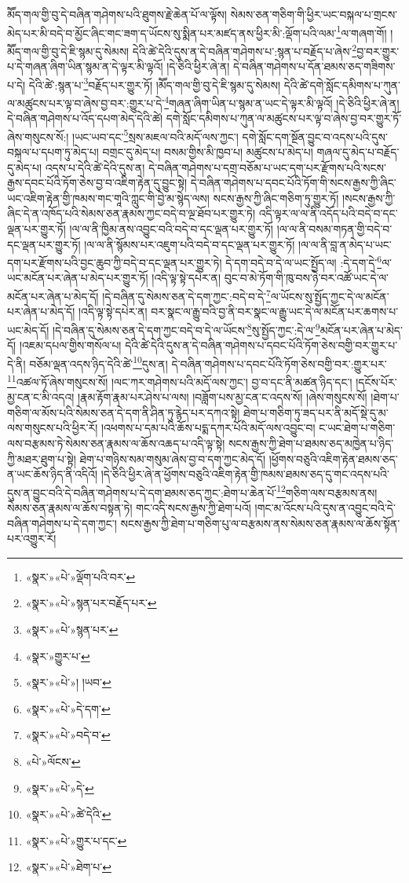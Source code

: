 མཽད་གལ་གྱི་བུ་དེ་བཞིན་གཤེགས་པའི་ཐུགས་རྗེ་ཆེན་པོ་ལ་ལྟོས། སེམས་ཅན་གཅིག་གི་ཕྱིར་ཡང་བསྐལ་པ་གྲངས་མེད་པར་མི་བདེ་བ་མྱོང་ཞིང་གང་ཟག་ད་ཡོངས་སུ་སྨིན་པར་མཛད་ནས་ཕྱིར་མི་:ལྡོག་པའི་ལམ་\footnote{«སྣར་»«པེ་»ལྡོག་པའི་བར་}ལ་གཞག་གོ། །མཽད་གལ་གྱི་བུ་དེ་ཇི་སྙམ་དུ་སེམས། དེའི་ཚེ་དེའི་དུས་ན་དེ་བཞིན་གཤེགས་པ་:སྙན་པ་བརྗོད་པ་ཞེས་\footnote{«སྣར་»«པེ་»སྙན་པར་བརྗོད་པར་}བྱ་བར་གྱུར་པ་དེ་གཞན་ཞིག་ཡིན་སྙམ་ན་དེ་ལྟར་མི་ལྟའོ། །དེ་ཅིའི་ཕྱིར་ཞེ་ན། དེ་བཞིན་གཤེགས་པ་དོན་ཐམས་ཅད་གཟིགས་པ་དེ། དེའི་ཚེ་:སྙན་པ་\footnote{«སྣར་»«པེ་»སྙན་པར་}བརྗོད་པར་གྱུར་ཏོ། །མཽད་གལ་གྱི་བུ་དེ་ཇི་སྙམ་དུ་སེམས། དེའི་ཚེ་དགེ་སློང་དམིགས་པ་ཀུན་ལ་མཚུངས་པར་ལྟ་བ་ཞེས་བྱ་བར་:གྱུར་པ་དེ་\footnote{«སྣར་»གྱུར་པ་}གཞན་ཞིག་ཡིན་པ་སྙམ་ན་ཡང་དེ་ལྟར་མི་ལྟའོ། །དེ་ཅིའི་ཕྱིར་ཞེ་ན། དེ་བཞིན་གཤེགས་པ་འོད་དཔག་མེད་དེའི་ཚེ། དགེ་སློང་དམིགས་པ་ཀུན་ལ་མཚུངས་པར་ལྟ་བ་ཞེས་བྱ་བར་གྱུར་ཏོ་ཞེས་གསུངས་སོ:། །ཡང་ཡབ་དང་\footnote{«སྣར་»«པེ་»། །ཡབ་}སྲས་མཇལ་བའི་མདོ་ལས་ཀྱང་། དགེ་སློང་དག་སྔོན་བྱུང་བ་འདས་པའི་དུས་བསྐལ་པ་དཔག་ཏུ་མེད་པ། བགྲང་དུ་མེད་པ། བསམ་གྱིས་མི་ཁྱབ་པ། མཚུངས་པ་མེད་པ། གཞལ་དུ་མེད་པ་བརྗོད་དུ་མེད་པ། འདས་པ་དེའི་ཚེ་དེའི་དུས་ན། དེ་བཞིན་གཤེགས་པ་དགྲ་བཅོམ་པ་ཡང་དག་པར་རྫོགས་པའི་སངས་རྒྱས་དབང་པོའི་ཏོག་ཅེས་བྱ་བ་འཇིག་རྟེན་དུ་བྱུང་སྟེ། དེ་བཞིན་གཤེགས་པ་དབང་པོའི་ཏོག་གི་སངས་རྒྱས་ཀྱི་ཞིང་ཡང་འཇིག་རྟེན་གྱི་ཁམས་གང་གཱའི་ཀླུང་གི་བྱེ་མ་སྙེད་ལས། སངས་རྒྱས་ཀྱི་ཞིང་གཅིག་ཏུ་གྱུར་ཏོ། །སངས་རྒྱས་ཀྱི་ཞིང་དེ་ན་འཁོད་པའི་སེམས་ཅན་རྣམས་ཀྱང་བདེ་བ་ལྔ་ཐོབ་པར་གྱུར་ཏེ། འདི་ལྟར་ལ་ལ་ནི་འདོད་པའི་བདེ་བ་དང་ལྡན་པར་གྱུར་ཏོ། །ལ་ལ་ནི་ཁྱིམ་ནས་འབྱུང་བའི་བདེ་བ་དང་ལྡན་པར་གྱུར་ཏོ། །ལ་ལ་ནི་བསམ་གཏན་གྱི་བདེ་བ་དང་ལྡན་པར་གྱུར་ཏོ། །ལ་ལ་ནི་སྙོམས་པར་འཇུག་པའི་བདེ་བ་དང་ལྡན་པར་གྱུར་ཏོ། །ལ་ལ་ནི་བླ་ན་མེད་པ་ཡང་དག་པར་རྫོགས་པའི་བྱང་ཆུབ་ཀྱི་བདེ་བ་དང་ལྡན་པར་གྱུར་ཏེ། དེ་དག་བདེ་བ་དེ་ལ་ཡང་སྤྱོད་ལ། :དེ་དག་དེ་\footnote{«སྣར་»«པེ་»དེ་དག་}ལ་ཡང་མངོན་པར་ཞེན་པ་མེད་པར་གྱུར་ཏོ། །འདི་ལྟ་སྟེ་དཔེར་ན། བུང་བ་མེ་ཏོག་གི་ཁུ་བས་ཉེ་བར་འཚོ་ཡང་དེ་ལ་མངོན་པར་ཞེན་པ་མེད་དོ། །དེ་བཞིན་དུ་སེམས་ཅན་དེ་དག་ཀྱང་:བདེ་བ་དེ་\footnote{«སྣར་»«པེ་»བདེ་བ་}ལ་ཡོངས་སུ་སྤྱོད་ཀྱང་དེ་ལ་མངོན་པར་ཞེན་པ་མེད་དོ། །འདི་ལྟ་སྟེ་དཔེར་ན། བར་སྣང་ལ་རྒྱུ་བའི་བྱ་ནི་བར་སྣང་ལ་རྒྱུ་ཡང་དེ་ལ་མངོན་པར་ཆགས་པ་ཡང་མེད་དོ། །དེ་བཞིན་དུ་སེམས་ཅན་དེ་དག་ཀྱང་བདེ་བ་དེ་ལ་ཡོངས་\footnote{«པེ་»ལོངས་}སུ་སྤྱོད་ཀྱང་:དེ་ལ་\footnote{«སྣར་»«པེ་»དེ་}མངོན་པར་ཞེན་པ་མེད་དོ། །འཇམ་དཔལ་གྱིས་གསོལ་པ། དེའི་ཚེ་དེའི་དུས་ན་དེ་བཞིན་གཤེགས་པ་དབང་པོའི་ཏོག་ཅེས་བགྱི་བར་གྱུར་པ་དེ་ནི། བཅོམ་ལྡན་འདས་ཉིད་དེའི་ཚེ་\footnote{«སྣར་»«པེ་»ཚེ་དེའི་}དུས་ན། དེ་བཞིན་གཤེགས་པ་དབང་པོའི་ཏོག་ཅེས་བགྱི་བར་:གྱུར་པར་\footnote{«སྣར་»«པེ་»གྱུར་པ་དང་}འཚལ་ཏོ་ཞེས་གསུངས་སོ། །ལང་ཀར་གཤེགས་པའི་མདོ་ལས་ཀྱང་། བྱ་བ་དང་ནི་མཚན་ཉིད་དང་། །དངོས་པོར་མྱ་ངན་ང་མི་འདའ། །རྣམ་རྟོག་རྣམ་པར་ཤེས་པ་ལས། །བཟློག་པས་མྱ་ངན་ང་འདས་སོ། །ཞེས་གསུངས་སོ། །ཐེག་པ་གཅིག་ལ་མོས་པའི་སེམས་ཅན་དེ་དག་ནི་ཤིན་ཏུ་རྙེད་པར་དཀའ་སྟེ། ཐེག་པ་གཅིག་ཏུ་ཟད་པར་ནི་མདོ་སྡེ་དུ་མ་ལས་གསུངས་པའི་ཕྱིར་རོ། །འཕགས་པ་དམ་པའི་ཆོས་པདྨ་དཀར་པོའི་མདོ་ལས་འབྱུང་བ། ང་ཡང་ཐེག་པ་གཅིག་ལས་བརྩམས་ཏེ་སེམས་ཅན་རྣམས་ལ་ཆོས་འཆད་པ་འདི་ལྟ་སྟེ། སངས་རྒྱས་ཀྱི་ཐེག་པ་ཐམས་ཅད་མཁྱེན་པ་ཉིད་ཀྱི་མཐར་ཐུག་པ་སྟེ། ཐེག་པ་གཉིས་སམ་གསུམ་ཞེས་བྱ་བ་དག་ཀྱང་མེད་དོ། །ཕྱོགས་བཅུའི་འཇིག་རྟེན་ཐམས་ཅད་ན་ཡང་ཆོས་ཉིད་ནི་འདིའོ། །དེ་ཅིའི་ཕྱིར་ཞེ་ན་ཕྱོགས་བཅུའི་འཇིག་རྟེན་གྱི་ཁམས་ཐམས་ཅད་དུ་གང་འདས་པའི་དུས་ན་བྱུང་བའི་དེ་བཞིན་གཤེགས་པ་དེ་དག་ཐམས་ཅད་ཀྱང་:ཐེག་པ་ཆེན་པོ་\footnote{«སྣར་»«པེ་»ཐེག་པ་}གཅིག་ལས་བརྩམས་ནས། སེམས་ཅན་རྣམས་ལ་ཆོས་བསྟན་ཏེ། གང་འདི་སངས་རྒྱས་ཀྱི་ཐེག་པའོ། །གང་མ་འོངས་པའི་དུས་ན་འབྱུང་བའི་དེ་བཞིན་གཤེགས་པ་དེ་དག་ཀྱང་། སངས་རྒྱས་ཀྱི་ཐེག་པ་གཅིག་པུ་ལ་བརྩམས་ནས་སེམས་ཅན་རྣམས་ལ་ཆོས་སྟོན་པར་འགྱུར་རོ། 